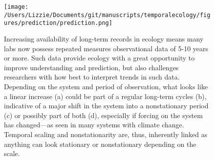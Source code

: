 \documentclass[11pt,a4paper,oneside]{article}
\begin{document}


\newpage
\begin{footnotesize}
{\def\section*#1{}

}
\end{footnotesize}

\newpage

\begin{figure}[h!]
\centering
\noindent \texttt{[image: /Users/Lizzie/Documents/git/manuscripts/temporalecology/figures/prediction/prediction.png]}
\caption{Increasing availability of long-term records in ecology means many labs now possess repeated measures observational data of 5-10 years or more. Such data provide ecology with a great opportunity to improve understanding and prediction, but also challenges researchers with how best to interpret trends in such data. Depending on the system and period of observation, what looks like a linear increase (a) could be part of a regular long-term cycles (b), indicative of a major shift in the system into a nonstationary period (c) or possibly part of both (d), especially if forcing on the system has changed---as seen in many systems with climate change. Temporal scaling and nonstationarity are, thus, inherently linked as anything can look stationary or nonstationary depending on the scale.}
\end{figure}
\end{document}
